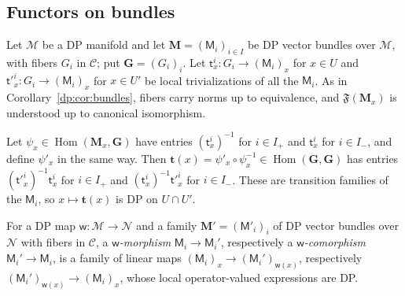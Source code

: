 \documentclass[11pt]{amsart}
\theoremstyle{definition}
\theoremstyle{remark}
\numberwithin{equation}{section}
\newcommand{\cC}{\mathcal{C}}
\theoremstyle{plain}
\theoremstyle{definition}
\theoremstyle{plain}
\begin{document}
\subsection{Functors on bundles}

Let $\mathcal M$ be a DP manifold and let $\mathbf M=(\mathsf M_i)_{i\in I}$ be DP vector bundles over $\mathcal M$, with fibers $G_i$ in $\cC$; put $\mathbf G=(G_i)_i$. Let $\mathsf t^i_x\colon G_i\to(\mathsf M_i)_x$ for $x\in U$ and $\mathsf t'^i_x\colon G_i\to(\mathsf M_i)_x$ for $x\in U'$ be local trivializations of all the $\mathsf M_i$. As in Corollary~\ref{dp:cor:bundles}, fibers carry norms up to equivalence, and $\mathfrak F(\mathbf M_x)$ is understood up to canonical isomorphism.

Let $\psi_x\in\operatorname{Hom}(\mathbf M_x,\mathbf G)$ have entries $(\mathsf t^i_x)^{-1}$ for $i\in I_+$ and $\mathsf t^i_x$ for $i\in I_-$, and define $\psi'_x$ in the same way. Then $\mathbf t(x)=\psi'_x\circ\psi_x^{-1}\in\operatorname{Hom}(\mathbf G,\mathbf G)$ has entries $(\mathsf t'^i_x)^{-1}\mathsf t^i_x$ for $i\in I_+$ and $(\mathsf t^i_x)^{-1}\mathsf t'^i_x$ for $i\in I_-$. These are transition families of the $\mathsf M_i$, so $x\mapsto\mathbf t(x)$ is DP on $U\cap U'$.

For a DP map $\mathsf w\colon\mathcal M\to\mathcal N$ and a family $\mathbf M'=(\mathsf M'_i)_i$ of DP vector bundles over $\mathcal N$ with fibers in $\cC$, a \emph{$\mathsf w$-morphism} $\mathsf M_i\to\mathsf M_i'$, respectively a \emph{$\mathsf w$-comorphism} $\mathsf M_i'\to\mathsf M_i$, is a family of linear maps $(\mathsf M_i)_x\to(\mathsf M_i')_{\mathsf w(x)}$, respectively $(\mathsf M_i')_{\mathsf w(x)}\to(\mathsf M_i)_x$, whose local operator-valued expressions are DP.
\end{document}
